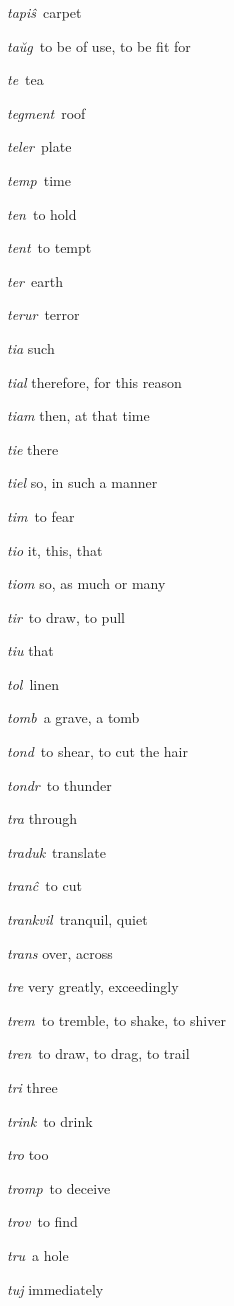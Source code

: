\begin{landscape}
\begin{multicols}{5}
\begin{outdent}{1em}
\emph{tapiŝ\,} carpet

\emph{taŭg\,} to be of use, to be fit for

\emph{te\,} tea

\emph{tegment\,} roof

\emph{teler\,} plate

\emph{temp\,} time

\emph{ten\,} to hold

\emph{tent\,} to tempt

\emph{ter\,} earth

\emph{terur\,} terror

\emph{tia} such

\emph{tial} therefore, for this reason

\emph{tiam} then, at that time

\emph{tie} there

\emph{tiel} so, in such a manner

\emph{tim\,} to fear

\emph{tio} it, this, that

\emph{tiom} so, as much or many

\emph{tir\,} to draw, to pull

\emph{tiu} that

\emph{tol\,} linen

\emph{tomb\,} a grave, a tomb

\emph{tond\,} to shear, to cut the hair

\emph{tondr\,} to thunder

\emph{tra} through

\emph{traduk\,} translate

\emph{tranĉ\,} to cut

\emph{trankvil\,} tranquil, quiet

\emph{trans} over, across

\emph{tre} very greatly, exceedingly

\emph{trem\,} to tremble, to shake, to shiver

\emph{tren\,} to draw, to drag, to trail

\emph{tri} three

\emph{trink\,} to drink

\emph{tro} too

\emph{tromp\,} to deceive

\emph{trov\,} to find

\emph{tru\,} a hole

\emph{tuj} immediately


\end{outdent}
\end{multicols}
\end{landscape}
